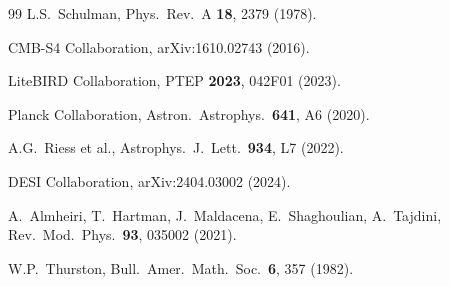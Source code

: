\documentclass[12pt,a4paper]{article}
\theoremstyle{plain}
\theoremstyle{definition}
\begin{document}
\begin{thebibliography}{99}
L.S.~Schulman,
Phys.\ Rev.\ A \textbf{18}, 2379 (1978).

CMB-S4 Collaboration,
arXiv:1610.02743 (2016).

LiteBIRD Collaboration,
PTEP \textbf{2023}, 042F01 (2023).

Planck Collaboration,
Astron.\ Astrophys.\ \textbf{641}, A6 (2020).

A.G.~Riess et al.,
Astrophys.\ J.\ Lett.\ \textbf{934}, L7 (2022).

DESI Collaboration,
arXiv:2404.03002 (2024).

A.~Almheiri, T.~Hartman, J.~Maldacena, E.~Shaghoulian, A.~Tajdini,
Rev.\ Mod.\ Phys.\ \textbf{93}, 035002 (2021).

W.P.~Thurston,
Bull.\ Amer.\ Math.\ Soc.\ \textbf{6}, 357 (1982).

\end{thebibliography}
\end{document}
